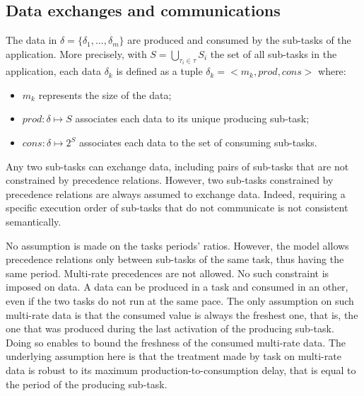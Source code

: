 \documentclass[main.tex]{subfiles}
\begin{document}
\subsection{Data exchanges and communications}
The data in $\delta = \{ \delta_1 , \ldots , \delta_m \}$ are produced and consumed by the sub-tasks of the application. More precisely, with $S = \underset{\tau_i \in \tau}{\bigcup} S_i$ the set of all sub-tasks in the application, each data $\delta_k$ is defined as a tuple $\delta_k = < m_k , prod , cons >$ where:
\begin{itemize}
    \item $m_k$ represents the size of the data;
    \item $prod : \delta \mapsto S$ associates each data to its unique producing sub-task;
    \item $cons : \delta \mapsto 2^S$ associates each data to the set of consuming sub-tasks.
\end{itemize}

Any two sub-tasks can exchange data, including pairs of sub-tasks that are not constrained by precedence relations. However, two sub-tasks constrained by precedence relations are always assumed to exchange data. Indeed, requiring a specific execution order of sub-tasks that do not communicate is not consistent semantically.

No assumption is made on the tasks periods' ratios. However, the model allows precedence relations only between sub-tasks of the same task, thus having the same period. Multi-rate precedences are not allowed. No such constraint is imposed on data. A data can be produced in a task and consumed in an other, even if the two tasks do not run at the same pace. The only assumption on such multi-rate data is that the consumed value is always the freshest one, that is, the one that was produced during the last activation of the producing sub-task. Doing so enables to bound the freshness of the consumed multi-rate data. The underlying assumption here is that the treatment made by task on multi-rate data is robust to its maximum production-to-consumption delay, that is equal to the period of the producing sub-task.
\end{document}
